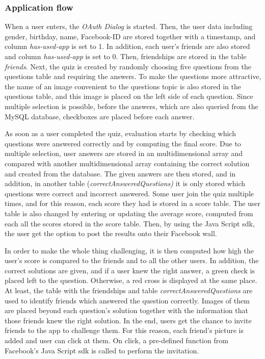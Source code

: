 \documentclass[preprint,12pt]{elsarticle}
\begin{document}
\subsubsection{Application flow}
\label{sec:application-flow}
When a user enters, the \textit{OAuth Dialog} is started. Then, the user data
including gender, birthday, name, Facebook-ID are stored together with
a timestamp, and column \textit{has-used-app} is set to 1. In
addition, each user's friends are also stored and column
\textit{has-used-app} is set to 0. Then, friendships are stored in the
table \textit{friends}. Next, the quiz is created by randomly choosing
five questions from the questions table and requiring the answers. To
make the questions more attractive, the name of an image convenient to
the questions topic is also stored in the questions table, and this
image is placed on the left side of each question. Since multiple
selection is possible, before the answers, which are also queried from
the MySQL database, checkboxes are placed before each answer. 

As soon as a user completed the quiz, evaluation starts by checking
which questions were answered correctly and by computing the final
score. Due to multiple selection, user answers are stored in
an multidimensional array and compared with another multidimensional
array containing the correct solution and created from the database.
The given answers are then stored, and in addition, in another table
(\textit{correctAnsweredQuestions)}
it is only stored which questions were correct and incorrect answered.
Some user join the quiz multiple times, and for this reason, each
score they had is stored in a score table. The user table is also
changed by entering or updating the average score, computed from each all the scores stored
in the score table. Then, by using the Java Script \ac{sdk}, the user
get the option to post the results onto their Facebook wall.

In order to make the whole thing challenging, it
is then computed how high the user's score is compared to the friends
and to all the other users. 
In addition, the correct solutions are given, and if a user knew the
right answer, a green check is placed left to the question. Otherwise,
a red cross is displayed at the same place. At least, the table with
the friendships and table \textit{correctAnsweredQuestions} are used
to identify friends  which answered the question correctly. Images of
them are placed beyond each question's solution together with the
information that those friends knew the right solution. 
In the end, users get the chance to invite friends to the app to
challenge them. For this reason, each friend's picture is added and
user can click at them. On click, a pre-defined function from
Facebook's Java Script \ac{sdk} is called to perform the invitation. 
\end{document}
